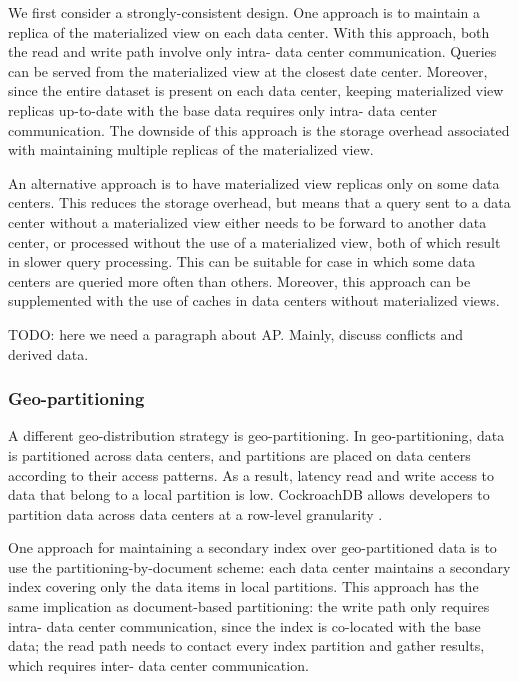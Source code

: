 \medskip

We first consider a strongly-consistent design.
One approach is to maintain a replica of the materialized view on each data center.
With this approach, both the read and write path involve only intra- data center communication.
Queries can be served from the materialized view at the closest date center.
Moreover, since the entire dataset is present on each data center,
keeping materialized view replicas up-to-date with the base data requires only intra- data center communication.
The downside of this approach is the storage overhead associated with maintaining multiple replicas of the materialized
view.

An alternative approach is to have materialized view replicas only on some data centers.
This reduces the storage overhead, but means that a query sent to a data center without a materialized view
either needs to be forward to another data center, or processed without the use of a materialized view,
both of which result in slower query processing.
This can be suitable for case in which some data centers are queried more often than others.
Moreover, this approach can be supplemented with the use of caches in data centers without materialized
views.

\medskip

TODO: here we need a paragraph about AP.
Mainly, discuss conflicts and derived data.

\subsubsection{Geo-partitioning}
A different geo-distribution strategy is geo-partitioning.
In geo-partitioning, data is partitioned across data centers, and partitions are placed on data centers according to
their access patterns.
As a result, latency read and write access to data that belong to a local partition is low.
CockroachDB allows developers to partition data across data centers at a row-level granularity
\cite{cockroachdb:geopartitioning}.

One approach for maintaining a secondary index over geo-partitioned data is to use the partitioning-by-document scheme:
each data center maintains a secondary index covering only the data items in local partitions.
This approach has the same implication as document-based partitioning:
the write path only requires intra- data center communication, since the index is co-located with the base data;
the read path needs to contact every index partition and gather results, which requires inter- data center
communication.

